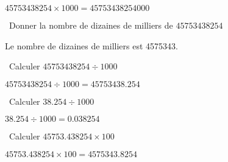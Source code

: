 \begin{questions}
		\begin{solution}
			$\num{45753438254} \times 1000 = \num{45753438254000}$
		\end{solution}
		
		\question[1]  Donner la nombre de dizaines de milliers de $\num{45753438254}$
		
		\begin{solution}
			Le nombre de dizaines de milliers est \num{4575343}.
		\end{solution}
		
		\question[1]  Calculer $\num{45753438254} \div 1000$
		
		\begin{solution}
			$\num{45753438254} \div 1000 = \num{45753438.254}$
		\end{solution}
		
		\question[1]  Calculer $\num{38.254} \div 1000$
		
		\begin{solution}
			$\num{38.254} \div 1000 = \num{0.038254}$
		\end{solution}
		
		\question[1]  Calculer $\num{45753.438254} \times 100$
		
		\begin{solution}
			$\num{45753.438254} \times 100 = \num{4575343.8254}$
		\end{solution}
	\end{questions}
	
	

